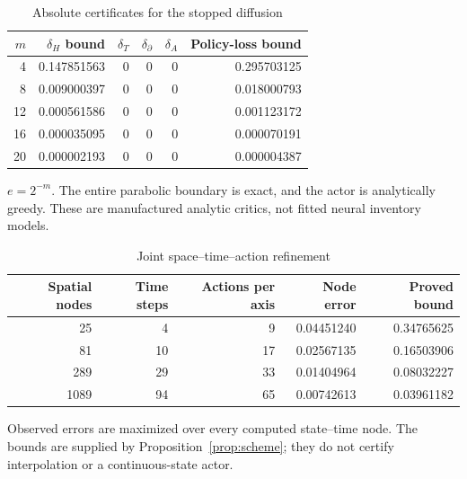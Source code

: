 \clearpage
\begin{table}[!ht]
\centering
\caption{Absolute certificates for the stopped diffusion}
\label{tab:pde}
\begin{tabular}{rrrrrr}
\toprule
$m$ & $\delta_H$ bound & $\delta_T$ & $\delta_\partial$ & $\delta_A$ & Policy-loss bound\\
\midrule
4 & 0.147851563 & 0 & 0 & 0 & 0.295703125\\
8 & 0.009000397 & 0 & 0 & 0 & 0.018000793\\
12 & 0.000561586 & 0 & 0 & 0 & 0.001123172\\
16 & 0.000035095 & 0 & 0 & 0 & 0.000070191\\
20 & 0.000002193 & 0 & 0 & 0 & 0.000004387\\
\bottomrule
\end{tabular}
\par\smallskip
\begin{minipage}{0.98\textwidth}\small $e=2^{-m}$. The entire parabolic boundary is exact, and the actor is analytically greedy. These are manufactured analytic critics, not fitted neural inventory models.\end{minipage}
\end{table}

\begin{table}[!ht]
\centering
\caption{Joint space--time--action refinement}
\label{tab:mesh}
\begin{tabular}{rrrrr}
\toprule
Spatial nodes & Time steps & Actions per axis & Node error & Proved bound\\
\midrule
25 & 4 & 9 & 0.04451240 & 0.34765625\\
81 & 10 & 17 & 0.02567135 & 0.16503906\\
289 & 29 & 33 & 0.01404964 & 0.08032227\\
1089 & 94 & 65 & 0.00742613 & 0.03961182\\
\bottomrule
\end{tabular}
\par\smallskip
\begin{minipage}{0.98\textwidth}\small Observed errors are maximized over every computed state--time node. The bounds are supplied by Proposition~\ref{prop:scheme}; they do not certify interpolation or a continuous-state actor.\end{minipage}
\end{table}
